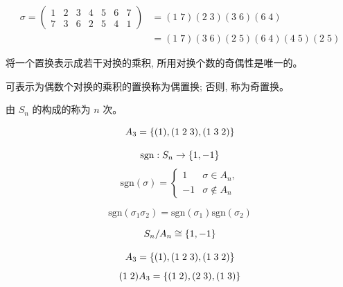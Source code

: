 \begin{frame}{}
  \begin{align*}
    \sigma = \begin{pmatrix}
      1 & 2 & 3 & 4 & 5 & 6 & 7 \\
      7 & 3 & 6 & 2 & 5 & 4 & 1
    \end{pmatrix} &=
    (1\;7) (2\;3) (3\;6) (6\;4) \\
    &= (1\;7) (3\;6) (2\;5) (6\;4) (4\;5) (2\;5)
  \end{align*}

  \pause
  \vspace{0.30cm}
  \begin{theorem}
    将一个置换表示成若干对换的乘积, 所用对换个数的奇偶性是唯一的。
  \end{theorem}
\end{frame}

\begin{frame}{}
  \begin{definition}
    可表示为偶数个对换的乘积的置换称为偶置换; 否则, 称为奇置换。
  \end{definition}

  \pause
  \vspace{0.80cm}
  \begin{definition}
    由 $S_{n}$ 的构成的称为 $n$ 次。
  \end{definition}

  \pause
  \[
    A_{3} = \{(1), (1\;2\;3), (1\;3\;2)\}
  \]
\end{frame}

\begin{frame}{}
  \[
    \text{sgn}: S_{n} \to \{1, -1\}
  \]
  \[
    \text{sgn}(\sigma) = \begin{cases}
      1 & \sigma \in A_{n}, \\
      -1 & \sigma \notin A_{n}
    \end{cases}
  \]

  \pause
  \[
    \text{sgn}(\sigma_{1}\sigma_{2}) = \text{sgn}(\sigma_{1})\text{sgn}(\sigma_{2})
  \]

  \pause
  \[
    S_{n}/A_{n} \cong \{1, -1\}
  \]
\end{frame}

\begin{frame}{}

  \[
    A_{3} = \{(1), (1\;2\;3), (1\;3\;2)\}
  \]
  \[
    (1\;2) A_{3} = \{(1\;2), (2\;3), (1\;3)\}
  \]
\end{frame}
